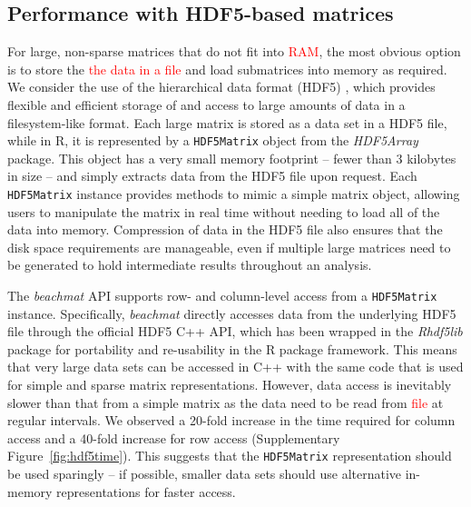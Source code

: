 \documentclass{article}
\newcommand{\beachmat}{\textit{beachmat}}
\newcommand{\code}[1]{\texttt{#1}}
\newcommand{\revised}[1]{\textcolor{red}{#1}}
\begin{document}
\subsection{Performance with HDF5-based matrices}
For large, non-sparse matrices that do not fit into \revised{RAM}, the most obvious option is to store the \revised{the data in a file} and load submatrices into memory as required.
We consider the use of the hierarchical data format (HDF5) \cite{hdf5}, which provides flexible and efficient storage of and access to large amounts of data in a filesystem-like format.
Each large matrix is stored as a data set in a HDF5 file, while in R, it is represented by a \code{HDF5Matrix} object from the \textit{HDF5Array} package.
This object has a very small memory footprint -- fewer than 3 kilobytes in size -- and simply extracts data from the HDF5 file upon request.
Each \code{HDF5Matrix} instance provides methods to mimic a simple matrix object, allowing users to manipulate the matrix in real time without needing to load all of the data into memory.
Compression of data in the HDF5 file also ensures that the disk space requirements are manageable, even if multiple large matrices need to be generated to hold intermediate results throughout an analysis.

The \beachmat{} API supports row- and column-level access from a \code{HDF5Matrix} instance.
Specifically, \beachmat{} directly accesses data from the underlying HDF5 file through the official HDF5 C++ API, which has been wrapped in the \textit{Rhdf5lib} package for portability and re-usability in the R package framework.
This means that very large data sets can be accessed in C++ with the same code that is used for simple and sparse matrix representations.
However, data access is inevitably slower than that from a simple matrix as the data need to be read from \revised{file} at regular intervals.
We observed a 20-fold increase in the time required for column access and a 40-fold increase for row access (Supplementary Figure~\ref{fig:hdf5time}).
This suggests that the \code{HDF5Matrix} representation should be used sparingly -- if possible, smaller data sets should use alternative in-memory representations for faster access.
\end{document}
